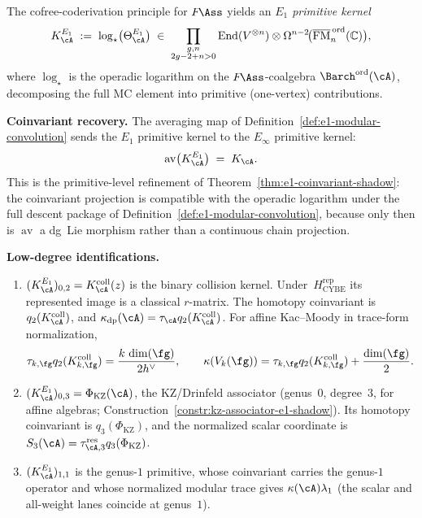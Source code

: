 \begin{remark}
\label{rem:e1-primitive-kernel}
The cofree-coderivation principle for $F\!\Ass$ yields an
\emph{$E_1$ primitive kernel}
\begin{equation}
\label{eq:e1-primitive-kernel}
K_\cA^{E_1}
\;:=\;
\log_\star\bigl(\Theta_\cA^{E_1}\bigr)
\;\in\;
\prod_{\substack{g,n \\ 2g-2+n > 0}}
\operatorname{End}(V^{\otimes n})
\otimes
\Omega^{n-2}\!\bigl(
\overline{\mathrm{FM}}_n^{\,\mathrm{ord}}(\mathbb{C})
\bigr),
\end{equation}
where $\log_\star$ is the operadic logarithm on the
$F\!\Ass$-coalgebra ${\Barch}^{\mathrm{ord}}(\cA)$, decomposing the
full MC element into primitive (one-vertex) contributions.

\medskip
\noindent\textbf{Coinvariant recovery.}
The averaging map of
Definition~\textup{\ref{def:e1-modular-convolution}} sends the $E_1$
primitive kernel to the $E_\infty$ primitive kernel:
\begin{equation}
\label{eq:e1-coinvariant-kernel}
\operatorname{av}\bigl(K_\cA^{E_1}\bigr)
\;=\;
K_\cA.
\end{equation}
This is the primitive-level refinement of
Theorem~\textup{\ref{thm:e1-coinvariant-shadow}}: the coinvariant
projection is compatible with the operadic logarithm under the full
descent package of Definition~\textup{\ref{def:e1-modular-convolution}},
because only then is $\operatorname{av}$ a dg~Lie morphism rather than
a continuous chain projection.

\medskip
\noindent\textbf{Low-degree identifications.}
\begin{enumerate}[label=\textup{(\roman*)}]
\item $(K_\cA^{E_1})_{0,2}=K_\cA^{\mathrm{coll}}(z)$ is the binary
 collision kernel.  Under~$H_{\mathrm{CYBE}}^{\mathrm{rep}}$ its
 represented image is a classical $r$-matrix.  The homotopy
 coinvariant is $q_2(K_\cA^{\mathrm{coll}})$, and
 $\kappa_{\mathrm{dp}}(\cA)=\tau_\cA q_2(K_\cA^{\mathrm{coll}})$.
 For affine Kac--Moody in trace-form normalization,
 \[
  \tau_{k,\fg}q_2(K_{k,\fg}^{\mathrm{coll}})
  =\frac{k\,\dim(\fg)}{2h^\vee},
  \qquad
  \kappa(V_k(\fg))
  =\tau_{k,\fg}q_2(K_{k,\fg}^{\mathrm{coll}})
   +\frac{\dim(\fg)}2.
 \]
\item $(K_\cA^{E_1})_{0,3} = \Phi_{\mathrm{KZ}}(\cA)$, the
 KZ\slash Drinfeld associator \textup{(}genus~$0$, degree~$3$,
 for affine algebras;
 Construction~\textup{\ref{constr:kz-associator-e1-shadow}}).
 Its homotopy coinvariant is $q_3(\Phi_{\mathrm{KZ}})$, and the
 normalized scalar coordinate is
 $S_3(\cA)=\tau_{\cA,3}^{\mathrm{res}}q_3(\Phi_{\mathrm{KZ}})$.
\item $(K_\cA^{E_1})_{1,1}$ is the genus-$1$ primitive, whose
 coinvariant carries the genus-$1$ operator and whose normalized
 modular trace gives $\kappa(\cA)\lambda_1$
 \textup{(the scalar and all-weight lanes coincide at genus~$1$)}.
\end{enumerate}


\end{remark}
